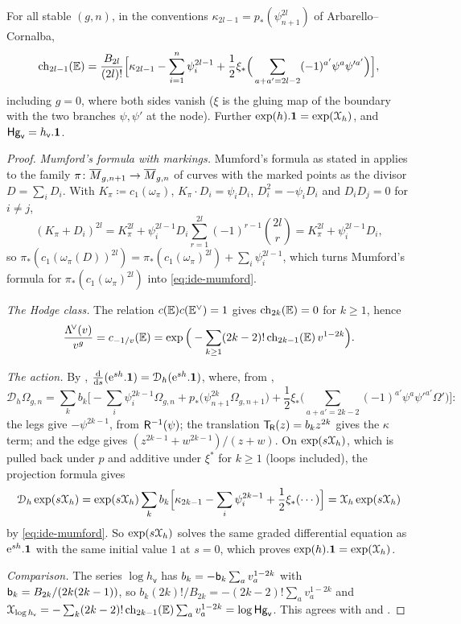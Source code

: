 \begin{lem}
\label{lem:ide-mumford}
For all stable $(g,n)$, in the conventions $\kappa_{2l-1}=p_*(\psi_{n+1}^{2l})$ of Arbarello--Cornalba,
\begin{equation}
\label{eq:ide-mumford}
\mathrm{ch}_{2l-1}(\mathbb{E})=\frac{B_{2l}}{(2l)!}\Big[\kappa_{2l-1}-\sum_{i=1}^n\psi_i^{2l-1}+\frac12\xi_*\Big(\sum_{a+a'=2l-2}(-1)^{a'}\psi^a\psi'^{a'}\Big)\Big],
\end{equation}
including $g=0$, where both sides vanish ($\xi$ is the gluing map of the boundary with the two branches $\psi,\psi'$ at the node). Further $\exp(h).\mathbf{1}=\exp(\mathcal{X}_h)$, and $\mathsf{Hg}_{\mathsf{v}}=h_{\mathsf{v}}.\mathbf{1}$.
\end{lem}
\begin{proof}
\emph{Mumford's formula with markings.} Mumford's formula as stated in \cite[Section~1.1]{FP00} applies to the family $\pi\colon\overline{M}_{g,n+1}\to\overline{M}_{g,n}$ of curves with the marked points as the divisor $D=\sum_iD_i$. With $K_\pi\coloneqq c_1(\omega_\pi)$, $K_\pi\cdot D_i=\psi_iD_i$, $D_i^2=-\psi_iD_i$ and $D_iD_j=0$ for $i\neq j$,
\[
(K_\pi+D_i)^{2l}=K_\pi^{2l}+\psi_i^{2l-1}D_i\sum_{r=1}^{2l}(-1)^{r-1}\binom{2l}{r}=K_\pi^{2l}+\psi_i^{2l-1}D_i,
\]
so $\pi_*(c_1(\omega_\pi(D))^{2l})=\pi_*(c_1(\omega_\pi)^{2l})+\sum_i\psi_i^{2l-1}$, which turns Mumford's formula for $\pi_*(c_1(\omega_\pi)^{2l})$ into \cref{eq:ide-mumford}.

\emph{The Hodge class.} The relation $c(\mathbb{E})c(\mathbb{E}^\vee)=1$ \cite[(5.4), (5.5)]{Mum83} gives $\mathrm{ch}_{2k}(\mathbb{E})=0$ for $k\geq 1$, hence
\[
\frac{\Lambda^{\!\vee}(v)}{v^g}=c_{-1/v}(\mathbb{E})=\exp\Big(-\sum_{k\geq 1}(2k-2)!\,\mathrm{ch}_{2k-1}(\mathbb{E})\,v^{1-2k}\Big).
\]

\emph{The action.} By \cite[Prop.~2.14]{PPZ15}, $\frac{\mathrm{d}}{\mathrm{d} s}(\mathrm{e}^{sh}.\mathbf{1})=\mathcal{D}_h(\mathrm{e}^{sh}.\mathbf{1})$, where, from \cite[Defs.~2.2, 2.13]{PPZ15},
\[
\mathcal{D}_h\Omega_{g,n}=\sum_kb_k\Big[-\sum_i\psi_i^{2k-1}\Omega_{g,n}+p_*\big(\psi_{n+1}^{2k}\Omega_{g,n+1}\big)+\frac12\xi_*\Big(\sum_{a+a'=2k-2}(-1)^{a'}\psi^a\psi'^{a'}\Omega'\Big)\Big]:
\]
the legs give $-\psi^{2k-1}$, from $\mathsf{R}^{-1}(\psi)$; the translation $\mathsf{T}_{\!\mathsf{R}}(z)=b_kz^{2k}$ gives the $\kappa$ term; and the edge gives $(z^{2k-1}+w^{2k-1})/(z+w)$. On $\exp(s\mathcal{X}_h)$, which is pulled back under $p$ and additive under $\xi^*$ for $k\geq 1$ (loops included), the projection formula gives
\[
\mathcal{D}_h\exp(s\mathcal{X}_h)=\exp(s\mathcal{X}_h)\sum_kb_k\Big[\kappa_{2k-1}-\sum_i\psi_i^{2k-1}+\frac12\xi_*(\cdots)\Big]=\mathcal{X}_h\exp(s\mathcal{X}_h)
\]
by \cref{eq:ide-mumford}. So $\exp(s\mathcal{X}_h)$ solves the same graded differential equation as $\mathrm{e}^{sh}.\mathbf{1}$ with the same initial value $1$ at $s=0$, which proves $\exp(h).\mathbf{1}=\exp(\mathcal{X}_h)$.

\emph{Comparison.} The series $\log h_{\mathsf{v}}$ has $b_k=-\mathsf{b}_k\sum_av_a^{1-2k}$ with $\mathsf{b}_k=B_{2k}/(2k(2k-1))$, so $b_k(2k)!/B_{2k}=-(2k-2)!\sum_av_a^{1-2k}$ and $\mathcal{X}_{\log h_{\mathsf{v}}}=-\sum_k(2k-2)!\,\mathrm{ch}_{2k-1}(\mathbb{E})\sum_av_a^{1-2k}=\log\mathsf{Hg}_{\mathsf{v}}$. This agrees with \cite[Prop.~8.7(i)]{Tel12} and \cite[Section~2.3, Lemma]{Giv01}.
\end{proof}

